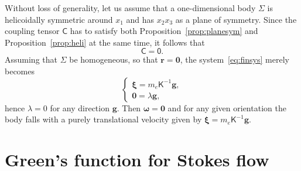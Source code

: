 \documentclass[final]{amsart}
\theoremstyle{definition}
\theoremstyle{definition}
\theoremstyle{remark}
\begin{document}
Without loss of generality, let us assume that a one-dimensional
body ${\Sigma}$ is helicoidally symmetric around $x_1$ and has $x_2x_3$ as
a plane of symmetry. Since the coupling tensor ${\mathsf C}$ has to satisfy
both Proposition~\ref{prop:planesym} and Proposition~\ref{prop:heli} at the same time,
it follows that
\[
{\mathsf C} = {\mathsf 0}.
\]
Assuming that $\Sigma$ be homogeneous, so that ${\boldsymbol r}={\boldsymbol 0}$, the
system~\eqref{eq:finsys} merely becomes
\[
\begin{cases}
{\boldsymbol \xi} =m_e{\mathsf K}^{-1}{\boldsymbol g},\\
{\boldsymbol 0}=\lambda{\boldsymbol g},
\end{cases}
\]
hence $\lambda = 0$ for any direction ${\boldsymbol g}$. Then ${\boldsymbol \omega}={\boldsymbol 0}$
and for any given orientation the body falls with a purely
translational velocity given by ${\boldsymbol \xi} =m_e{\mathsf K}^{-1}{\boldsymbol g}$.

\appendix

\section{Green's function for Stokes flow}
\label{app}
\end{document}
